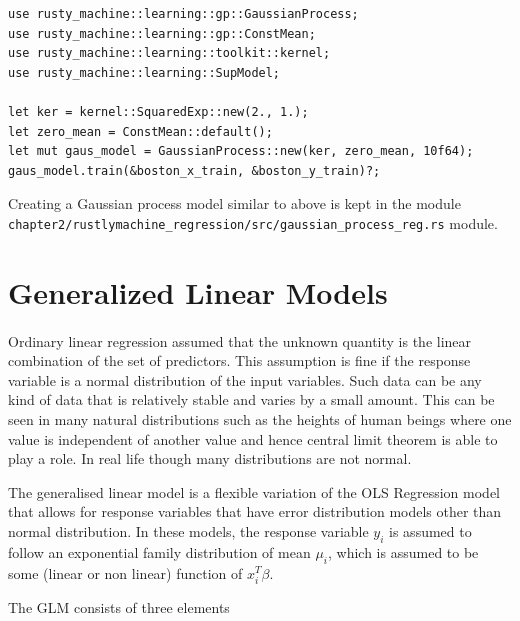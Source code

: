 \documentclass{book}
\begin{document}
\begin{lstlisting}[caption={gaussian\_process\_reg\\.rs}]
use rusty_machine::learning::gp::GaussianProcess;
use rusty_machine::learning::gp::ConstMean;
use rusty_machine::learning::toolkit::kernel;
use rusty_machine::learning::SupModel;

let ker = kernel::SquaredExp::new(2., 1.);
let zero_mean = ConstMean::default();
let mut gaus_model = GaussianProcess::new(ker, zero_mean, 10f64);
gaus_model.train(&boston_x_train, &boston_y_train)?;
\end{lstlisting}

Creating a Gaussian process model similar to above is kept in the module \lstinline{chapter2/rustlymachine_regression/src/gaussian_process_reg.rs} module.

\label{sub:gaussian_process}

\section{Generalized Linear Models}%
\paragraph{}%
Ordinary linear regression assumed that the unknown quantity is the linear combination of the set of predictors. This assumption is fine if the response variable is a normal distribution of the input variables. Such data can be any kind of data that is relatively stable and varies by a small amount. This can be seen in many natural distributions such as the heights of human beings where one value is independent of another value and hence central limit theorem is able to play a role. In real life though many distributions are not normal.


The generalised linear model is a flexible variation of the OLS Regression model that allows for response variables that have error distribution models other than normal distribution. In these models, the response variable $y_i$ is assumed to follow an exponential family distribution of mean $\mu_i$, which is assumed to be some (linear or non linear) function of $x_i^T\beta$\cite{WEBSITE:2}.

The GLM consists of three elements\cite{WEBSITE:3} 
\end{document}

